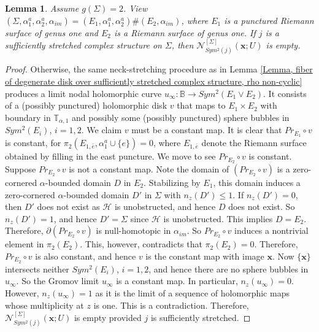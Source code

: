 \documentclass{amsart}
\newtheorem{lem}[thm]{Lemma}
\theoremstyle{definition}
\theoremstyle{remark}
\numberwithin{equation}{section}
\numberwithin{equation}{section} \makeatletter
\begin{document}
\begin{lem}\label{Lemma, moduli space of 1-P degenerate disks without corners with symmetric almost complex structures}
Assume $g(\Sigma)=2$. View $(\Sigma,\alpha_1^a,\alpha^a_2,\alpha_{im})=(E_1,\alpha_1^a,\alpha_2^a)\# (E_2,\alpha_{im})$, where $E_1$ is a punctured Riemann surface of genus one and $E_2$ is a Riemann surface of genus one. If $j$ is a sufficiently stretched complex structure on $\Sigma$, then $\mathcal{N}^{[\Sigma]}_{Sym^2(j)}(\bm{x};U)$ is empty. 
\end{lem}  
\begin{proof}
Otherwise, the same neck-stretching procedure as in Lemma \ref{Lemma, fiber of degenerate disk over sufficiently stretched complex structure, rho non-cyclic} produces a limit nodal holomorphic curve $u_\infty:\mathbb{B}\rightarrow Sym^2(E_1\vee E_2)$. It consists of a (possibly punctured) holomorphic disk $v$ that maps to $E_1\times E_2$ with boundary in $\mathbb{T}_{\alpha,1}$ and possibly some (possibly punctured) sphere bubbles in $Sym^2(E_i)$, $i=1,2$. We claim $v$ must be a constant map. It is clear that $Pr_{E_1}\circ v$ is constant, for $\pi_2(E_{1,\bar{e}},\alpha^a_1\cup \{e\})=0$, where $E_{1,\bar{e}}$ denote the Riemann surface obtained by filling in the east puncture. We move to see $Pr_{E_2}\circ v$ is constant. Suppose $Pr_{E_2}\circ v$ is not a constant map.  Note the domain of $ (Pr_{E_2}\circ v)$ is a zero-cornered $\alpha$-bounded domain $D$ in $E_2$. Stabilizing by $E_1$, this domain induces a zero-cornered $\alpha$-bounded domain $D'$ in $\Sigma$ with $n_z(D')\leq 1$. If $n_z(D')=0$, then $D'$ does not exist as $\mathcal{H}$ is unobstructed, and hence $D$ does not exist. So $n_z(D')=1$, and hence $D'=\Sigma$ since $\mathcal{H}$ is unobstructed. This implies $D=E_2$. Therefore, $\partial(Pr_{E_2}\circ v)$ is null-homotopic in $\alpha_{im}$. So $Pr_{E_2}\circ v$ induces a nontrivial element in $\pi_2(E_2)$. This, however, contradicts that $\pi_2(E_2)=0$. Therefore, $Pr_{E_2}\circ v$ is also constant, and hence $v$ is the constant map with image $\bm{x}$. Now $\{\bm{x}\}$ intersects neither $Sym^2(E_i)$, $i=1,2$, and hence there are no sphere bubbles in $u_{\infty}$. So the Gromov limit $u_{\infty}$ is a constant map. In particular, $n_z(u_\infty)=0$. However, $n_z(u_\infty)=1$ as it is the limit of a sequence of holomorphic maps whose multiplicity at $z$ is one. This is a contradiction. Therefore, $\mathcal{N}^{[\Sigma]}_{Sym^2(j)}(\bm{x};U)$ is empty provided $j$ is sufficiently stretched. 
\end{proof}
\end{document}
